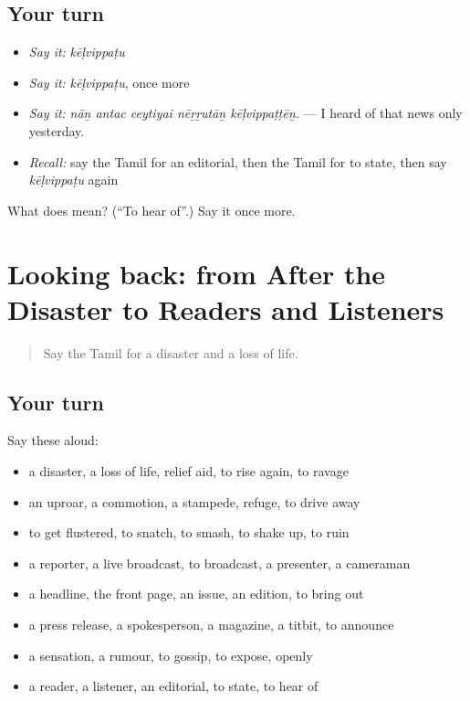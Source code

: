 \subsection*{Your turn}
\begin{itemize}
\raggedright
  \item \emph{Say it:} \emph{kēḷvippaṭu}
  \item \emph{Say it:} \emph{kēḷvippaṭu}, once more
  \item \emph{Say it:} \emph{nāṉ antac ceytiyai nēṟṟutāṉ kēḷvippaṭṭēṉ.} — I heard of that news only yesterday.
  \item \emph{Recall:} say the Tamil for an editorial, then the Tamil for to state, then say \emph{kēḷvippaṭu} again
\end{itemize}

\begin{tcolorbox}[breakable,colback=teal!4,colframe=teal!35!black,title={Before you move on}]
What does  mean? (\textquotedblleft{}To hear of\textquotedblright{}.) Say it once more.
\end{tcolorbox}
\section[(dialogue)]{Looking back: from After the Disaster to Readers and Listeners}

\label{lesson:TA-R309-review-302-309}



\begin{quote}
Say the Tamil for a disaster and a loss of life.
\end{quote}

\subsection*{Your turn}
Say these aloud:

\begin{itemize}
\raggedright
  \item a disaster, a loss of life, relief aid, to rise again, to ravage
  \item an uproar, a commotion, a stampede, refuge, to drive away
  \item to get flustered, to snatch, to smash, to shake up, to ruin
  \item a reporter, a live broadcast, to broadcast, a presenter, a cameraman
  \item a headline, the front page, an issue, an edition, to bring out
  \item a press release, a spokesperson, a magazine, a titbit, to announce
  \item a sensation, a rumour, to gossip, to expose, openly
  \item a reader, a listener, an editorial, to state, to hear of
\end{itemize}

